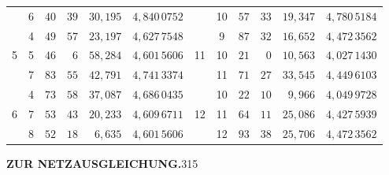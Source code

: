 \begin{center}
\begin{tabular}{|c|c|r@{\;}r@{\;}r|c||c|c|r@{\;}r@{\;}r|c|}
 & 6 & $40$ & $39$ & $30{,}195$ & $4{,}840\,0752$ &  & 10 & $57$ & $33$ & $19{,}347$ & $4{,}780\,5184$\\[3pt]
 & 4 & $49$ & $57$ & $23{,}197$ & $4{,}627\,7548$ &  & 9 & $87$ & $32$ & $16{,}652$ & $4{,}472\,3562$\\
5 & 5 & $46$ & $6$ & $58{,}284$ & $4{,}601\,5606$ & 11 & 10 & $21$ & $0$ & $10{,}563$ & $4{,}027\,1430$\\
 & 7 & $83$ & $55$ & $42{,}791$ & $4{,}741\,3374$ &  & 11 & $71$ & $27$ & $33{,}545$ & $4{,}449\,6103$\\[3pt]
 & 4 & $73$ & $58$ & $37{,}087$ & $4{,}686\,0435$ &  & 10 & $22$ & $10$ & $9{,}966$ & $4{,}049\,9728$\\
6 & 7 & $53$ & $43$ & $20{,}233$ & $4{,}609\,6711$ & 12 & 11 & $64$ & $11$ & $25{,}086$ & $4{,}427\,5939$\\
 & 8 & $52$ & $18$ & $6{,}635$ & $4{,}601\,5606$ &  & 12 & $93$ & $38$ & $25{,}706$ & $4{,}472\,3562$\\
\end{tabular}\end{center}
\clearpage
\noindent\textbf{ZUR NETZAUSGLEICHUNG.}\hfill315
